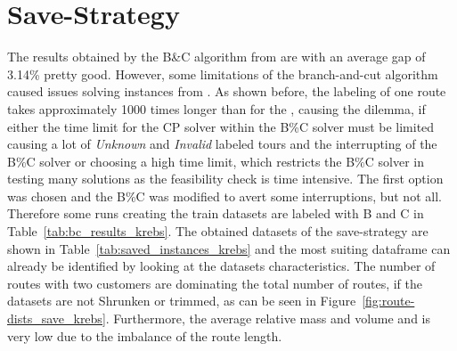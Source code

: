 \section{Save-Strategy}
\label{sec:challenges_krebs_save}

The results obtained by the B\&C algorithm from \cite{tamke_branch-and-cut_2024} are with an average gap of 3.14\% pretty good. However, some limitations
of the branch-and-cut algorithm caused issues solving instances from \krebsADataSet. As shown before, the labeling of one route takes approximately
1000 times longer than for the \gendreauDataSet, causing the dilemma, if either the time limit for the \gls{CP} solver within the B\%C solver
must be limited causing a lot of \textit{Unknown} and \textit{Invalid} labeled tours and the interrupting of the B\%C solver or choosing
a high time limit, which restricts the B\%C solver in testing many solutions as the feasibility check is time intensive. The first option
was chosen and the B\%C was modified to avert some interruptions, but not all. Therefore some runs creating the train datasets are labeled with
B and C in Table~\ref{tab:bc_results_krebs}. The obtained datasets of the save-strategy are shown in Table~\ref{tab:saved_instances_krebs}
and the most suiting dataframe can already be identified by looking at the datasets characteristics. The number of routes with two customers
are dominating the total number of routes, if the datasets are not Shrunken or trimmed, as can be seen in Figure~\ref{fig:route-dists_save_krebs}. Furthermore, the average relative mass and volume and
is very low due to the imbalance of the route length.

